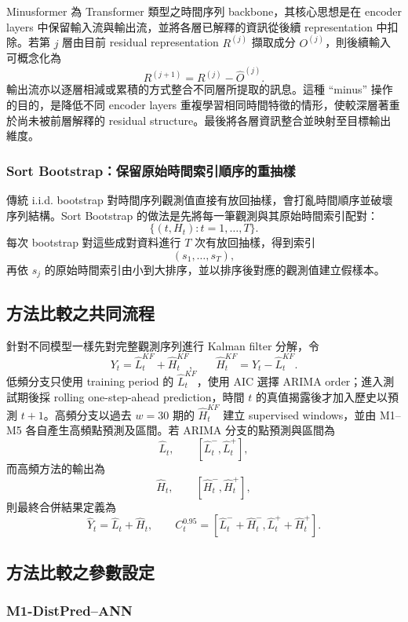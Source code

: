 {Minusformer 為 Transformer 類型之時間序列 backbone，其核心思想是在 encoder layers 中保留輸入流與輸出流，並將各層已解釋的資訊從後續 representation 中扣除。若第 $j$ 層由目前 residual representation $R^{(j)}$ 擷取成分 $O^{(j)}$，則後續輸入可概念化為
\[
    R^{(j+1)}=R^{(j)}-\widehat O^{(j)}.
\]
輸出流亦以逐層相減或累積的方式整合不同層所提取的訊息。這種 ``minus'' 操作的目的，是降低不同 encoder layers 重複學習相同時間特徵的情形，使較深層著重於尚未被前層解釋的 residual structure。最後將各層資訊整合並映射至目標輸出維度。

\subsubsection*{Sort Bootstrap：保留原始時間索引順序的重抽樣}

傳統 i.i.d. bootstrap 對時間序列觀測值直接有放回抽樣，會打亂時間順序並破壞序列結構。Sort Bootstrap 的做法是先將每一筆觀測與其原始時間索引配對：
\[
    \{(t,H_t):t=1,\ldots,T\}.
\]
每次 bootstrap 對這些成對資料進行 $T$ 次有放回抽樣，得到索引
\[
    (s_1,\ldots,s_T),
\]
再依 $s_j$ 的原始時間索引由小到大排序，並以排序後對應的觀測值建立假樣本。

\subsection*{方法比較之共同流程}

針對不同模型一樣先對完整觀測序列進行 Kalman filter 分解，令
\[
    Y_t=\widehat L_t^{KF}+\widehat H_t^{KF},
    \qquad
    \widehat H_t^{KF}=Y_t-\widehat L_t^{KF}.
\]
低頻分支只使用 training period 的 $\widehat L_t^{KF}$，使用 AIC 選擇 ARIMA order；進入測試期後採 rolling one-step-ahead prediction，時間 $t$ 的真值揭露後才加入歷史以預測 $t+1$。高頻分支以過去 $w=30$ 期的 $\widehat H_t^{KF}$ 建立 supervised windows，並由 M1--M5 各自產生高頻點預測及區間。若 ARIMA 分支的點預測與區間為
\[
    \widehat L_t,\qquad
    [\widehat L_t^{-},\widehat L_t^{+}],
\]
而高頻方法的輸出為
\[
    \widehat H_t,\qquad
    [\widehat H_t^{-},\widehat H_t^{+}],
\]
則最終合併結果定義為
\[
    \widehat Y_t=\widehat L_t+\widehat H_t,
    \qquad
    C_t^{0.95}=
    [\widehat L_t^{-}+\widehat H_t^{-},
     \widehat L_t^{+}+\widehat H_t^{+}].
\]

\subsection*{方法比較之參數設定}

\subsubsection*{M1-DistPred--ANN}

}
